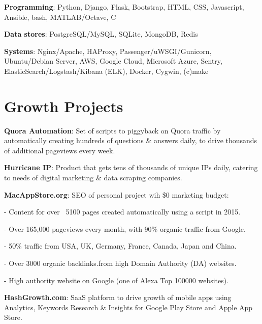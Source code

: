 \documentclass[overlapped,centered]{resume}
\begin{document}
\begin{resume}
    \begin{list2}
	\item \textbf{Programming}: Python, Django, Flask, Bootstrap, HTML, CSS, Javascript, Ansible, bash, MATLAB/Octave, C
	\item \textbf{Data stores}: PostgreSQL/MySQL, SQLite,	MongoDB, Redis
	\item \textbf{Systems}: Nginx/Apache, HAProxy, Passenger/uWSGI/Gunicorn, Ubuntu/Debian Server, AWS, Google Cloud, Microsoft Azure, Sentry, ElasticSearch/Logstash/Kibana (ELK), Docker, Cygwin, (c)make
	\end{list2}

    \section{\mysidestyle Growth Projects} 
	\begin{list2}
	
	\item \textbf{Quora Automation}: Set of scripts to piggyback on Quora traffic by automatically creating hundreds of questions \& answers daily, to drive thousands of additional pageviews every week.
	
	\item \textbf{Hurricane IP}: Product that gets tens of thousands of unique IPs daily, catering to needs of digital marketing \& data scraping companies.
	
	\item \textbf{MacAppStore.org}: SEO of personal project wih \$0 marketing budget:

	\setlength{\leftskip}{15pt}
	
		- Content for over ~5100 pages created automatically using a script in 2015.
	
		- Over 165,000 pageviews every month, with 90\% organic traffic from Google.
	
		- 50\% traffic from USA, UK, Germany, France, Canada, Japan and China.
	
		- Over 3000 organic backlinks.from high Domain Authority (DA) websites.
	
		- High authority website on Google (one of Alexa Top 100000 websites).
	
	\setlength{\leftskip}{0pt}
	
	\item \textbf{HashGrowth.com}: SaaS platform to drive growth of mobile apps using Analytics, Keywords Research \& Insights for Google Play Store and Apple App Store.
	

\end{list2}
\end{resume}
\end{document}
